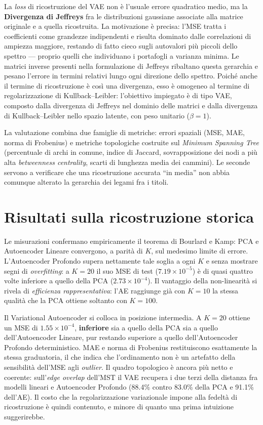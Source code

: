 \documentclass[11pt,a4paper]{article}
\begin{document}
La \emph{loss} di ricostruzione del VAE non è l'usuale errore quadratico
medio, ma la \textbf{Divergenza di Jeffreys} fra le distribuzioni gaussiane
associate alla matrice originale e a quella ricostruita. La motivazione è
precisa: l'MSE tratta i coefficienti come grandezze indipendenti e risulta
dominato dalle correlazioni di ampiezza maggiore, restando di fatto cieco
sugli autovalori più piccoli dello spettro --- proprio quelli che individuano
i portafogli a varianza minima. Le matrici inverse presenti nella formulazione
di Jeffreys ribaltano questa gerarchia e pesano l'errore in termini relativi
lungo ogni direzione dello spettro. Poiché anche il termine di ricostruzione è
così una divergenza, esso è omogeneo al termine di regolarizzazione di
Kullback--Leibler: l'obiettivo impiegato è di tipo VAE, composto dalla
divergenza di Jeffreys nel dominio delle matrici e dalla divergenza di
Kullback--Leibler nello spazio latente, con peso unitario ($\beta = 1$).

La valutazione combina due famiglie di metriche: errori spaziali (MSE, MAE,
norma di Frobenius) e metriche topologiche costruite sul \emph{Minimum
Spanning Tree} (percentuale di archi in comune, indice di Jaccard,
sovrapposizione dei nodi a più alta \emph{betweenness centrality}, scarti di
lunghezza media dei cammini). Le seconde servono a verificare che una
ricostruzione accurata ``in media'' non abbia comunque alterato la gerarchia dei
legami fra i titoli.

\section{Risultati sulla ricostruzione storica}

Le misurazioni confermano empiricamente il teorema di Bourlard e Kamp: PCA e
Autoencoder Lineare convergono, a parità di $K$, sul medesimo limite di
errore. L'Autoencoder Profondo supera nettamente tale soglia a ogni $K$ e
senza mostrare segni di \emph{overfitting}: a $K = 20$ il suo MSE di test
($7.19 \times 10^{-5}$) è di quasi quattro volte inferiore a quello della PCA
($2.73 \times 10^{-4}$). Il vantaggio della non-linearità si rivela di
\emph{efficienza rappresentativa}: l'AE raggiunge già con $K = 10$ la stessa
qualità che la PCA ottiene soltanto con $K = 100$.

Il Variational Autoencoder si colloca in posizione intermedia. A $K = 20$
ottiene un MSE di $1.55 \times 10^{-4}$, \textbf{inferiore} sia a quello della
PCA sia a quello dell'Autoencoder Lineare, pur restando superiore a quello
dell'Autoencoder Profondo deterministico. MAE e norma di Frobenius
restituiscono esattamente la stessa graduatoria, il che indica che
l'ordinamento non è un artefatto della sensibilità dell'MSE agli \emph{outlier}.
Il quadro topologico è ancora più netto e coerente: sull'\emph{edge overlap}
dell'MST il VAE recupera i due terzi della distanza fra modelli lineari e
Autoencoder Profondo (88.4\% contro 83.0\% della PCA e 91.1\% dell'AE). Il
costo che la regolarizzazione variazionale impone alla fedeltà di
ricostruzione è quindi contenuto, e minore di quanto una prima
intuizione suggerirebbe.
\end{document}
